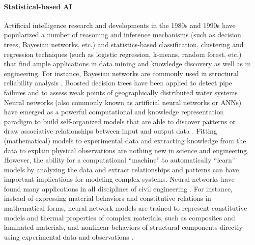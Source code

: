 \paragraph{Statistical-based AI} Artificial intelligence research and developments in the 1980s and 1990s have popularized a number of reasoning and inference mechanisms (such as decision trees, Bayesian networks, etc.) and statistics-based classification, clustering and regression techniques (such as logistic regression, k-means, random forest, etc.) that find ample applications in data mining and knowledge discovery as well as in engineering. For instance, Bayesian networks are commonly used in structural reliability analysis \citep{straub2010bayesian}. Boosted decision trees have been applied to detect pipe failures and to assess weak points of geographically distributed water systems \citep{winkler2018pipe, kumar2018using}. Neural networks (also commonly known as artificial neural networks or ANNs) have emerged as a powerful computational and knowledge representation paradigm to build self-organized models that are able to discover patterns or draw associative relationships between input and output data \citep{bishop1995neural}. Fitting (mathematical) models to experimental data and extracting knowledge from the data to explain physical observations are nothing new in science and engineering. However, the ability for a computational ``machine'' to automatically ``learn'' models by analyzing the data and extract relationships and patterns can have important implications for modeling complex systems. Neural networks have found many applications in all disciplines of civil engineering \citep{garrettjr1996ai, kartam1997artificial}. For instance, instead of expressing material behaviors and constitutive relations in mathematical forms, neural network models are trained to represent constitutive models and thermal properties of complex materials, such as composites and laminated materials, and nonlinear behaviors of structural components directly using experimental data and observations \citep{ghaboussi1991knowledgebased, ghaboussi1998autoprogressive, aquino2006self}. 
 
